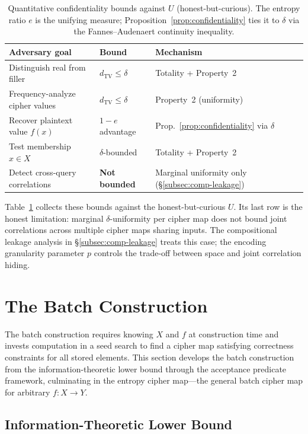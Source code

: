 \documentclass[11pt]{article}
\theoremstyle{definition}
\theoremstyle{plain}
\theoremstyle{remark}
\newcommand{\TV}{d_{\mathrm{TV}}}
\begin{document}
\begin{table}[ht]
\centering
\caption{Quantitative confidentiality bounds against $U$ (honest-but-curious).
The entropy ratio $e$ is the unifying measure;
Proposition~\ref{prop:confidentiality} ties it to $\delta$ via the
Fannes--Audenaert continuity inequality.}
\label{tab:guarantees}
\begin{tabular}{@{}lll@{}}
\toprule
Adversary goal & Bound & Mechanism \\
\midrule
Distinguish real from filler & $\TV \leq \delta$ & Totality + Property~2 \\
Frequency-analyze cipher values & $\TV \leq \delta$ & Property~2 (uniformity) \\
Recover plaintext value $f(x)$ & $1 - e$ advantage & Prop.~\ref{prop:confidentiality} via $\delta$ \\
Test membership $x \in X$ & $\delta$-bounded & Totality + Property~2 \\
Detect cross-query correlations & \textbf{Not bounded} & Marginal uniformity only (\S\ref{subsec:comp-leakage}) \\
\bottomrule
\end{tabular}
\end{table}

Table~\ref{tab:guarantees} collects these bounds against the
honest-but-curious $U$.  Its last row is the honest limitation:
marginal $\delta$-uniformity per cipher map does not bound joint
correlations across multiple cipher maps sharing inputs.  The compositional leakage analysis in
\S\ref{subsec:comp-leakage} treats this case; the encoding granularity
parameter $p$ controls the trade-off between space and joint correlation
hiding.


\section{The Batch Construction}
\label{sec:batch}

The batch construction requires knowing $X$ and $f$ at construction time
and invests computation in a seed search to find a cipher map satisfying
correctness constraints for all stored elements.  This section develops the
batch construction from the information-theoretic lower bound through the
acceptance predicate framework, culminating in the entropy cipher map---the
general batch cipher map for arbitrary $f : X \to Y$.

\subsection{Information-Theoretic Lower Bound}
\label{subsec:lower-bound}
\end{document}
